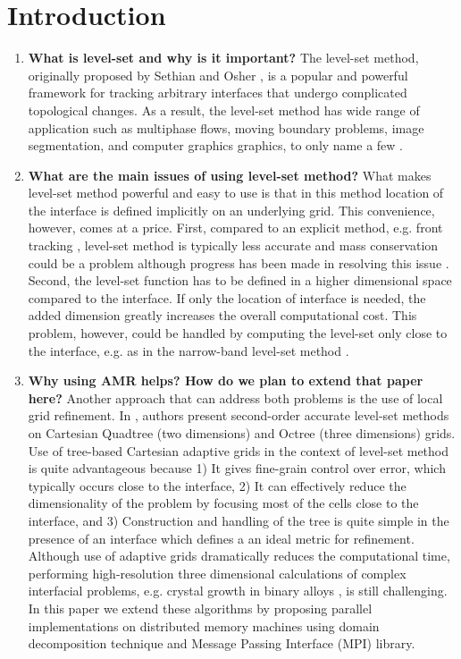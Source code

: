 \section{Introduction}
\begin{enumerate}
\item \textbf{What is level-set and why is it important?}
The level-set method, originally proposed by Sethian and Osher , is a popular and powerful framework for tracking arbitrary interfaces that undergo complicated topological changes. As a result, the level-set method has wide range of application such as multiphase flows, moving boundary problems, image segmentation, and computer graphics graphics, to only name a few .

\item \textbf{What are the main issues of using level-set method?}
What makes level-set method powerful and easy to use is that in this method location of the interface is defined implicitly on an underlying grid. This convenience, however, comes at a price. First, compared to an explicit method, e.g. front tracking , level-set method is typically less accurate and mass conservation could be a problem although progress has been made in resolving this issue . Second, the level-set function has to be defined in a higher dimensional space compared to the interface. If only the location of interface is needed, the added dimension greatly increases the overall computational cost. This problem, however, could be handled by computing the level-set only close to the interface, e.g. as in the narrow-band level-set method .

\item \textbf{Why using AMR helps? How do we plan to extend that paper here?}
Another approach that can address both problems is the use of local grid refinement. In , authors present second-order accurate level-set methods on Cartesian Quadtree (two dimensions) and Octree (three dimensions) grids. Use of tree-based Cartesian adaptive grids in the context of level-set method is quite advantageous because 1) It gives fine-grain control over error, which typically occurs close to the interface, 2) It can effectively reduce the dimensionality of the problem by focusing most of the cells close to the interface, and 3) Construction and handling of the tree is quite simple in the presence of an interface which defines a an ideal metric for refinement. Although use of adaptive grids dramatically reduces the computational time, performing high-resolution three dimensional calculations of complex interfacial problems, e.g. crystal growth in binary alloys , is still challenging. In this paper we extend these algorithms by proposing parallel implementations on distributed memory machines using domain decomposition technique and Message Passing Interface (MPI) library.


\end{enumerate}
